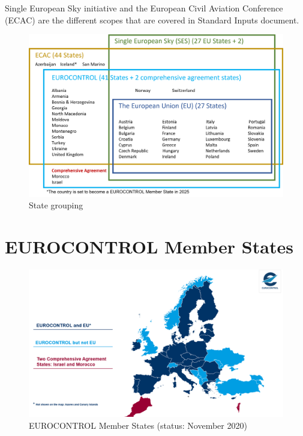 \documentclass[
  11pt,
  a4paper,
]{book}
\begin{document}

Single European Sky initiative and the European Civil Aviation
Conference (ECAC) are the different scopes that are covered in Standard
Inputs document.

\begin{figure}

{\centering \includegraphics{./figures/eu_orgs.png}

}

\caption{\label{fig-member-states-set-diagram}State grouping}

\end{figure}

\hypertarget{eurocontrol-member-states}{%
\section*{EUROCONTROL Member States}\label{eurocontrol-member-states}}


\begin{figure}

{\centering \includegraphics{./figures/eurocontrol_ms.png}

}

\caption{\label{fig-eurocontrol-member-states}EUROCONTROL Member States
(status: November 2020)}

\end{figure}
\end{document}
